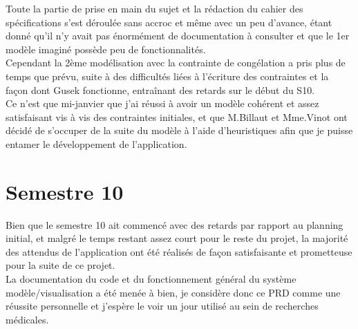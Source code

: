 \documentclass{polytech/polytech}
\numberwithin{figure}{chapter}
\begin{document}
Toute la partie de prise en main du sujet et la rédaction du cahier des spécifications s'est déroulée sans accroc et même avec un peu d'avance, étant donné qu'il n'y avait pas énormément de documentation à consulter et que le 1er modèle imaginé possède peu de fonctionnalités.\\
Cependant la 2ème modélisation avec la contrainte de congélation a pris plus de temps que prévu, suite à des difficultés liées à l'écriture des contraintes et la façon dont Gusek fonctionne, entraînant des retards sur le début du S10.\\
Ce n'est que mi-janvier que j'ai réussi à avoir un modèle cohérent et assez satisfaisant vis à vis des contraintes initiales, et que M.Billaut et Mme.Vinot ont décidé de s'occuper de la suite du modèle à l'aide d'heuristiques afin que je puisse entamer le développement de l'application.

\section{Semestre 10}

Bien que le semestre 10 ait commencé avec des retards par rapport au planning initial, et malgré le temps restant assez court pour le reste du projet, la majorité des attendus de l'application ont été réalisés de façon satisfaisante et prometteuse pour la suite de ce projet.\\
La documentation du code et du fonctionnement général du système modèle/visualisation a été menée à bien, je considère donc ce PRD comme une réussite personnelle et j'espère le voir un jour utilisé au sein de recherches médicales. 
\end{document}
